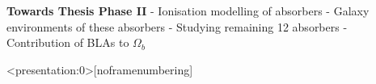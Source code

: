 \documentclass[aspectratio=169]{beamer}
\newcommand\ion[2]{\text{#1\,\textsc{\lowercase{#2}}}}
\begin{document}
\begin{markdown}
\begin{frame}{\huge{\textbf{Towards Thesis Phase II}}}
- Ionisation modelling of \ion{O}{vi} absorbers
- Galaxy environments of these absorbers
- Studying remaining 12 absorbers
- Contribution of BLAs to $\Omega_b$


\end{frame}










\begin{frame}<presentation:0>[noframenumbering]

{\cite{Fukugita-1998} \cite{Shull} \cite{cen-ostriker-1999} \cite{tepper-2013} \cite{savage-2014} \cite{danforth-2016} \cite{acharya_khaire}}
    
\end{frame}
    

\end{markdown}
\end{document}
